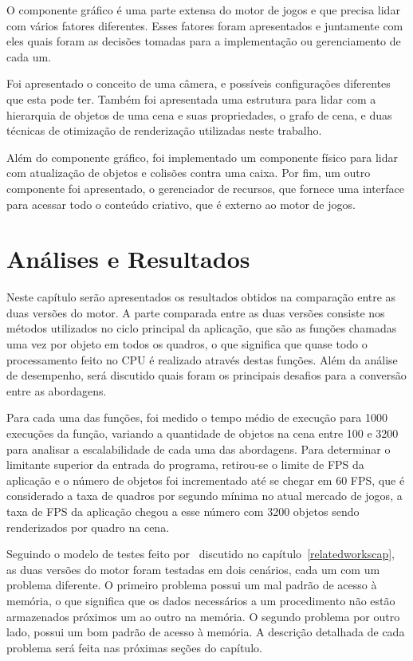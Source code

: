O componente gráfico é uma parte extensa do motor de jogos e que precisa lidar com 
vários fatores diferentes. Esses fatores foram apresentados e juntamente com eles 
quais foram as decisões tomadas para a implementação ou gerenciamento de cada um.

Foi apresentado o conceito de uma câmera, e possíveis configurações diferentes que 
esta pode ter. Também foi apresentada uma estrutura para lidar com a hierarquia de 
objetos de uma cena e suas propriedades, o grafo de cena, e duas técnicas de otimização 
de renderização utilizadas neste trabalho.

Além do componente gráfico, foi implementado um componente físico 
para lidar com atualização de objetos e colisões contra uma caixa.
Por fim, um outro componente foi apresentado, o gerenciador de 
recursos, que fornece uma interface para acessar todo o conteúdo 
criativo, que é externo ao motor de jogos.

\chapter{Análises e Resultados}
\label{resultscap}

Neste capítulo serão apresentados os resultados obtidos na 
comparação entre as duas versões do motor. A parte comparada 
entre as duas versões consiste nos métodos utilizados no 
ciclo principal da aplicação, que são as funções chamadas 
uma vez por objeto em todos os quadros, o que significa que 
quase todo o processamento feito no CPU é realizado através 
destas funções. Além da análise de desempenho, será 
discutido quais foram os principais desafios para a 
conversão entre as abordagens.

Para cada uma das funções, foi medido o tempo médio de execução 
para 1000 execuções da função, variando a quantidade de objetos 
na cena entre 100 e 3200 para analisar 
a escalabilidade de cada uma das abordagens. Para determinar o 
limitante superior da entrada do programa, retirou-se o limite de 
FPS da aplicação e o número de objetos foi incrementado até se chegar 
em 60 FPS, que é considerado a taxa de quadros por segundo mínima no 
atual mercado de jogos, a taxa de FPS da aplicação chegou a esse 
número com 3200 objetos sendo renderizados por quadro na cena.

Seguindo o modelo de testes feito por~ 
discutido no capítulo~\ref{relatedworkscap}, as duas versões 
do motor foram testadas em dois cenários, cada um com um 
problema diferente. O primeiro problema possui um mal padrão 
de acesso à memória, o que significa que os dados necessários 
a um procedimento não estão armazenados próximos um ao outro 
na memória. O segundo problema por outro lado, possui um bom 
padrão de acesso à memória. A descrição detalhada de cada 
problema será feita nas próximas seções do capítulo.


